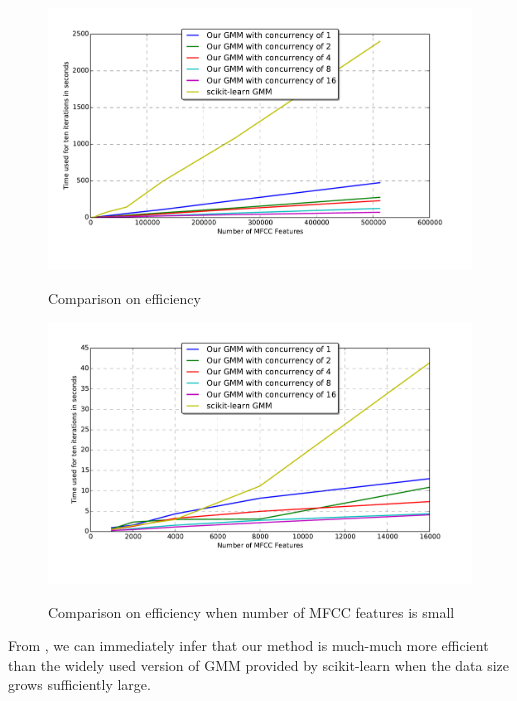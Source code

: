 \begin{figure}[!ht]
	\begin{minipage}{0.48\linewidth}
		\label{fig:gmm_efficiency}
		\centering
		\includegraphics[width=\linewidth]{res/time-comp.pdf}
		\caption{Comparison on efficiency}
	\end{minipage}
	\hfill
	\begin{minipage}{0.48\linewidth}
		\label{fig:gmm_efficiency_small}
		\centering
		\includegraphics[width=\linewidth]{res/time-comp-small.pdf}
		\caption{Comparison on efficiency when number of MFCC features is small}
	\end{minipage}
\end{figure}

From , we can immediately infer that our method
is much-much more efficient than the widely used version of GMM provided
by scikit-learn when the data size grows sufficiently large.


